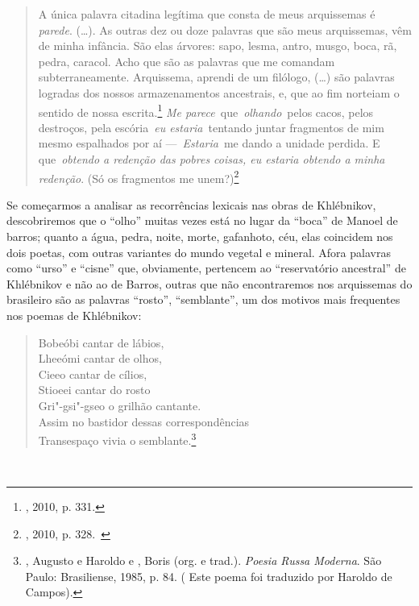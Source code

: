 \begin{quote}
A única palavra citadina legítima que consta de meus arquissemas é
\emph{parede}. (\ldots{}). As outras dez ou doze palavras que são meus
arquissemas, vêm de minha infância. São elas árvores: sapo, lesma,
antro, musgo, boca, rã, pedra, caracol. Acho que são as palavras que me
comandam subterraneamente. Arquissema, aprendi de um filólogo, (\ldots{}) são
palavras logradas dos nossos armazenamentos ancestrais, e, que ao fim
norteiam o sentido de nossa escrita.\footnote{, 2010, p. 331.}
\emph{Me parece}~que~\emph{olhando}~pelos cacos, pelos destroços, pela
escória~\emph{eu estaria}~tentando juntar fragmentos de mim mesmo
espalhados por aí ---~\emph{Estaria}~me dando a unidade perdida. E
que~\emph{obtendo a redenção das pobres coisas, eu estaria obtendo a
minha redenção}. (Só os fragmentos me unem?)\footnote{, 2010, p.
  328.~}
\end{quote}

Se começarmos a analisar as recorrências lexicais nas obras de
Khlébnikov, descobriremos que o ``olho'' muitas vezes está no lugar da
``boca'' de Manoel de barros; quanto a água, pedra, noite, morte,
gafanhoto, céu, elas coincidem nos dois poetas, com outras variantes do
mundo vegetal e mineral. Afora palavras como ``urso'' e ``cisne'' que,
obviamente, pertencem ao ``reservatório ancestral'' de Khlébnikov e não
ao de Barros, outras que não encontraremos nos arquissemas do brasileiro
são as palavras ``rosto'', ``semblante'', um dos motivos mais frequentes
nos poemas de Khlébnikov:

\begin{quote}
Bobeóbi cantar de lábios,\\
Lheeómi cantar de olhos,\\
Cieeo cantar de cílios,\\
Stioeei cantar do rosto\\
Gri"-gsi"-gseo o grilhão cantante.\\
\hspace*{0.333em}Assim no bastidor dessas correspondências\\
\hspace*{0.333em}Transespaço vivia o semblante.\footnote{, Augusto
  e Haroldo e , Boris (org. e trad.). \emph{Poesia Russa
  Moderna}. São Paulo: Brasiliense, 1985, p. 84. ( Este poema foi
  traduzido por Haroldo de Campos).}
\end{quote}

~~~~~~~~~~~~~

